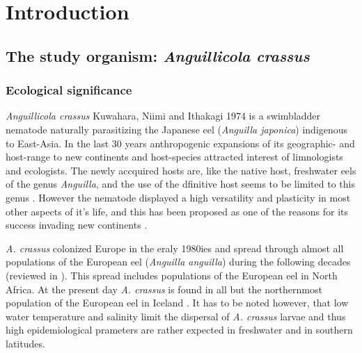 

\chapter{Introduction}
\label{intro}
\ifpdf
    \graphicspath{{1_introduction/figures/PNG/}{1_introduction/figures/PDF/}{1_introduction/figures/}}
\else
    \graphicspath{{1_introduction/figures/EPS/}{1_introduction/figures/}}
\fi


\section{The study organism: \textit{Anguillicola crassus}} 
\label{stud-org}

\subsection{Ecological significance} 
\label{eco-sig}

\textit{Anguillicola crassus} Kuwahara, Niimi and Ithakagi 1974
\cite{kuwahara_Niimi_Itagaki_1974, moravec_anguillicoloides} is a
swimbladder nematode naturally parasitizing the Japanese eel
(\textit{Anguilla japonica}) indigenous to East-Asia. In the last 30
years anthropogenic expansions of its geographic- and host-range to
new continents and host-species attracted interest of limnologists and
ecologists. The newly accquired hosts are, like the native host,
freshwater eels of the genus \textit{Anguilla}, and the use of the
dfinitive host seems to be limited to this genus
\cite{sures_development_1999}. However the nematode displayed a high
versatility and plasticity in most other aspects of it's life, and
this has been proposed as one of the reasons for its success invading
new continents \cite{taraschewski_hosts_2007}.

\textit{A. crassus} colonized Europe in the eraly 1980ies and spread
through almost all populations of the European eel (\textit{Anguilla
  anguilla}) during the following decades (reviewed in
\cite{kirk_impact_2003}). This spread includes populations of the
European eel in North
Africa\cite{gargouri_ben_abdallah_spatio-temporal_2006,
  loukili_dynamics_2007}. At the present day \textit{A. crassus} is
found in all but the northernmost population of the European eel in
Iceland \cite{kristmundsson_parasite_2007}. It has to be noted
however, that low water temperature \cite{knopf_impact_1998} and
salinity \cite{kirk_effect_2000} limit the dispersal of
\textit{A. crassus} larvae and thus high epidemiological prameters are
rather expected in freshwater and in southern latitudes.

